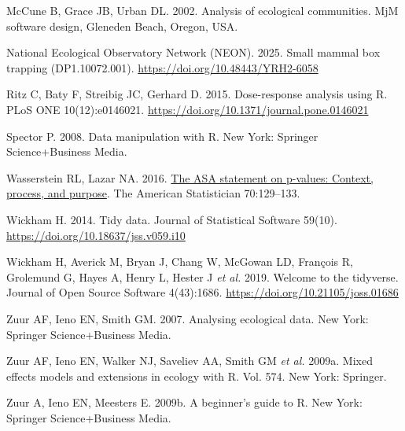 \documentclass[
  13,
  letterpaper,
]{report}
\newlength{\cslhangindent}
\newenvironment{CSLReferences}[2] %
 {\begin{list}{}{%
  \setlength{\itemindent}{0pt}
  \setlength{\leftmargin}{0pt}
  \setlength{\parsep}{0pt}
  \ifodd #1
   \setlength{\leftmargin}{\cslhangindent}
   \setlength{\itemindent}{-1\cslhangindent}
  \fi
  \setlength{\itemsep}{#2\baselineskip}}}
 {\end{list}}
\begin{document}
\begin{CSLReferences}{1}{1}
McCune B, Grace JB, Urban DL. 2002. Analysis of ecological communities.
MjM software design, Gleneden Beach, Oregon, USA.

National Ecological Observatory Network (NEON). 2025. Small mammal box
trapping (DP1.10072.001). \url{https://doi.org/10.48443/YRH2-6058}

Ritz C, Baty F, Streibig JC, Gerhard D. 2015. Dose-response analysis
using {R}. PLoS ONE 10(12):e0146021.
\url{https://doi.org/10.1371/journal.pone.0146021}

Spector P. 2008. Data manipulation with {R}. New York: Springer
Science+Business Media.

Wasserstein RL, Lazar NA. 2016.
\href{https://doi.org/10.1080/00031305.2016.1154108}{The ASA statement
on p-values: Context, process, and purpose}. The American Statistician
70:129--133.

Wickham H. 2014. Tidy data. Journal of Statistical Software 59(10).
\url{https://doi.org/10.18637/jss.v059.i10}

Wickham H, Averick M, Bryan J, Chang W, McGowan LD, François R,
Grolemund G, Hayes A, Henry L, Hester J \emph{et al.} 2019. Welcome to
the {tidyverse}. Journal of Open Source Software 4(43):1686.
\url{https://doi.org/10.21105/joss.01686}

Zuur AF, Ieno EN, Smith GM. 2007. Analysing ecological data. New York:
Springer Science+Business Media.

Zuur AF, Ieno EN, Walker NJ, Saveliev AA, Smith GM \emph{et al.} 2009a.
Mixed effects models and extensions in ecology with {R}. Vol. 574. New
York: Springer.

Zuur A, Ieno EN, Meesters E. 2009b. A beginner's guide to {R}. New York:
Springer Science+Business Media.

\end{CSLReferences}
\end{document}
